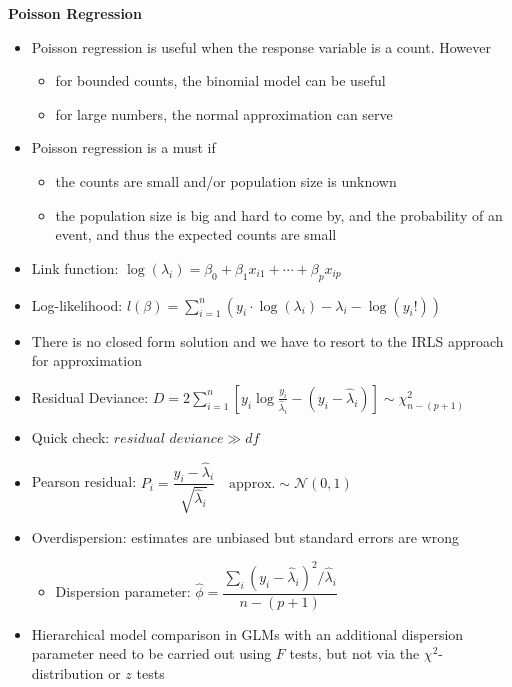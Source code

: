 \documentclass[a4paper]{article}
\begin{document}
\textbf{Poisson Regression}
\begin{itemize}
    \item Poisson regression is useful when the response variable is a count. However
    \begin{itemize}
        \item for bounded counts, the binomial model can be useful
        \item for large numbers, the normal approximation can serve
    \end{itemize}
    \item Poisson regression is a must if
    \begin{itemize}
        \item the counts are small and/or population size is unknown
        \item the population size is big and hard to come by, and the probability of an event, and thus the expected counts are small
    \end{itemize}
    \item Link function: $\log(\lambda_i)=\beta_0+\beta_1x_{i1}+\cdots+\beta_px_{ip}$
    \item Log-likelihood: $l(\beta)=\sum\limits_{i=1}^n\left(y_i\cdot\log(\lambda_i)-\lambda_i-\log(y_i!) \right)$
    \item There is no closed form solution and we have to resort to the IRLS approach for approximation
    \item Residual Deviance: $D=2\sum\limits_{i=1}^n\left[y_i\log\frac{y_i}{\hat{\lambda}_i}-(y_i-\hat{\lambda}_i) \right]\sim\chi_{n-(p+1)}^2$
    \item Quick check: $\textit{residual deviance}\gg df$
    \item Pearson residual: $P_i=\dfrac{y_i-\hat{\lambda}_i}{\sqrt{\hat{\lambda}_i}}\quad\textrm{approx.}\sim\mathcal{N}(0,1)$
    \item Overdispersion: estimates are unbiased but standard errors are wrong
    \begin{itemize}
        \item Dispersion parameter: $\hat{\phi}=\dfrac{\sum_i(y_i-\hat{\lambda}_i)^2/\hat{\lambda}_i}{n-(p+1)}$
    \end{itemize}
    \item Hierarchical model comparison in GLMs with an additional dispersion parameter need to be carried out using $F$ tests, but not via the $\chi^2$-distribution or $z$ tests
\end{itemize}
\end{document}
